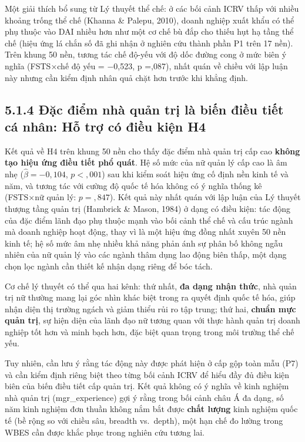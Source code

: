 \documentclass[
  a4paper,
  13pt]{extreport}
\begin{document}
Một giải thích bổ sung từ Lý thuyết thể chế: ở các bối cảnh ICRV thấp
với nhiều khoảng trống thể chế (Khanna \& Palepu, 2010), doanh nghiệp
xuất khẩu có thể phụ thuộc vào DAI nhiều hơn như một cơ chế bù đắp cho
thiếu hụt hạ tầng thể chế (hiệu ứng lá chắn số đã ghi nhận ở nghiên cứu
thành phần P1 trên 17 nền). Trên khung 50 nền, tương tác chế độ-yếu với
độ dốc đường cong ở mức biên ý nghĩa (FSTS×chế độ yếu = −0,523, p
=,087), nhất quán về chiều với lập luận này nhưng cần kiểm định nhân quả
chặt hơn trước khi khẳng định.

\hypertarget{ux111ux1eb7c-ux111iux1ec3m-nhuxe0-quux1ea3n-trux1ecb-luxe0-biux1ebfn-ux111iux1ec1u-tiux1ebft-cuxe1-nhuxe2n-hux1ed7-trux1ee3-cuxf3-ux111iux1ec1u-kiux1ec7n-h4}{%
\subsection{5.1.4 Đặc điểm nhà quản trị là biến điều tiết cá nhân: Hỗ
trợ có điều kiện
H4}\label{ux111ux1eb7c-ux111iux1ec3m-nhuxe0-quux1ea3n-trux1ecb-luxe0-biux1ebfn-ux111iux1ec1u-tiux1ebft-cuxe1-nhuxe2n-hux1ed7-trux1ee3-cuxf3-ux111iux1ec1u-kiux1ec7n-h4}}

Kết quả về H4 trên khung 50 nền cho thấy đặc điểm nhà quản trị cấp cao
\textbf{không tạo hiệu ứng điều tiết phổ quát}. Hệ số mức của nữ quản lý
cấp cao là âm nhẹ (\(\hat{\beta} = -0{,}104\), \(p < {,}001\)) sau khi
kiểm soát hiệu ứng cố định nền kinh tế và năm, và tương tác với cường độ
quốc tế hóa không có ý nghĩa thống kê (FSTS×nữ quản lý: \(p = {,}847\)).
Kết quả này nhất quán với lập luận của Lý thuyết thượng tầng quản trị
(Hambrick \& Mason, 1984) ở dạng có điều kiện: tác động của đặc điểm
lãnh đạo phụ thuộc mạnh vào bối cảnh thể chế và cấu trúc ngành mà doanh
nghiệp hoạt động, thay vì là một hiệu ứng đồng nhất xuyên 50 nền kinh
tế; hệ số mức âm nhẹ nhiều khả năng phản ánh sự phân bố không ngẫu nhiên
của nữ quản lý vào các ngành thâm dụng lao động biên thấp, một dạng chọn
lọc ngành cần thiết kế nhận dạng riêng để bóc tách.

Cơ chế lý thuyết có thể qua hai kênh: thứ nhất, \textbf{đa dạng nhận
thức}, nhà quản trị nữ thường mang lại góc nhìn khác biệt trong ra quyết
định quốc tế hóa, giúp nhận diện thị trường ngách và giảm thiểu rủi ro
tập trung; thứ hai, \textbf{chuẩn mực quản trị}, sự hiện diện của lãnh
đạo nữ tương quan với thực hành quản trị doanh nghiệp tốt hơn và minh
bạch hơn, đặc biệt quan trọng trong môi trường thể chế yếu.

Tuy nhiên, cần lưu ý rằng tác động này được phát hiện ở cấp gộp toàn mẫu
(P7) và cần kiểm định riêng biệt theo từng bối cảnh ICRV để hiểu đầy đủ
điều kiện biên của biến điều tiết cấp quản trị. Kết quả không có ý nghĩa
về kinh nghiệm nhà quản trị (mgr\_experience) gợi ý rằng trong bối cảnh
châu Á đa dạng, số năm kinh nghiệm đơn thuần không nắm bắt được
\textbf{chất lượng} kinh nghiệm quốc tế (bề rộng so với chiều sâu,
breadth vs.~depth), một hạn chế đo lường trong WBES cần được khắc phục
trong nghiên cứu tương lai.
\end{document}
